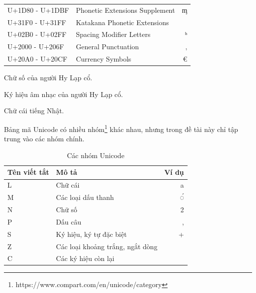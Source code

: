 \begin{table}[htb]
\begin{threeparttable}
\begin{tabular}{llr}
            U+1D80 - U+1DBF   & Phonetic Extensions Supplement          & ᶆ              \\
            U+31F0 - U+31FF   & Katakana Phonetic Extensions\tnote{3}   &                \\
            U+02B0 - U+02FF   & Spacing Modifier Letters                & ʰ              \\
            U+2000 - U+206F   & General Punctuation                     & ‚              \\
            U+20A0 - U+20CF   & Currency Symbols                        & €              \\
            \bottomrule
        \end{tabular}
        \begin{tablenotes}
            \item [1] Chữ số của người Hy Lạp cổ.
            \item [2] Ký hiệu âm nhạc của người Hy Lạp cổ.
            \item [3] Chữ cái tiếng Nhật.
        \end{tablenotes}
    \end{threeparttable}
\end{table}

\newpage
Bảng mã Unicode có nhiều nhóm\footnote{https://www.compart.com/en/unicode/category} khác nhau, nhưng trong đề tài này chỉ tập trung vào các nhóm chính.
\begin{table}[htb]
    \centering
    \caption{Các nhóm Unicode}
    \label{table:unicode-categories}
    \begin{tabular}{llr}
        \toprule
        \textbf{Tên viết tắt} & \textbf{Mô tả}                   & \textbf{Ví dụ} \\\midrule
        L                     & Chữ cái                          & a              \\
        M                     & Các loại dấu thanh               & ◌́              \\
        N                     & Chữ số                           & 2              \\
        P                     & Dấu câu                          & ,              \\
        S                     & Ký hiệu, ký tự đặc biệt          & +              \\
        Z                     & Các loại khoảng trắng, ngắt dòng &                \\
        C                     & Các ký hiệu còn lại              &                \\
        \bottomrule
    \end{tabular}
\end{table}


